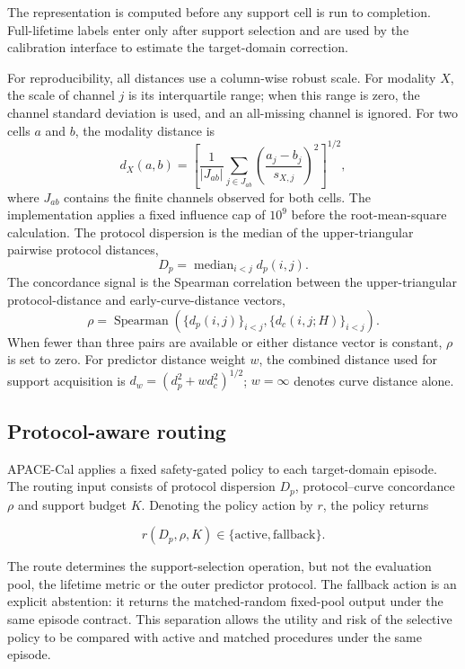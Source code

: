 \documentclass[preprint,12pt]{elsarticle}
\begin{document}
The representation is computed before any support cell is run to completion. Full-lifetime labels enter only after support selection and are used by the calibration interface to estimate the target-domain correction.

For reproducibility, all distances use a column-wise robust scale. For modality $X$, the scale of channel $j$ is its interquartile range; when this range is zero, the channel standard deviation is used, and an all-missing channel is ignored. For two cells $a$ and $b$, the modality distance is
\begin{equation}
d_X(a,b)=\left[\frac{1}{|J_{ab}|}\sum_{j\in J_{ab}}\left(\frac{a_j-b_j}{s_{X,j}}\right)^2\right]^{1/2},
\end{equation}
where $J_{ab}$ contains the finite channels observed for both cells. The implementation applies a fixed influence cap of $10^9$ before the root-mean-square calculation. The protocol dispersion is the median of the upper-triangular pairwise protocol distances,
\begin{equation}
D_p=\operatorname{median}_{i<j}d_p(i,j).
\end{equation}
The concordance signal is the Spearman correlation between the upper-triangular protocol-distance and early-curve-distance vectors,
\begin{equation}
\rho=\operatorname{Spearman}\!\left(\{d_p(i,j)\}_{i<j},\{d_c(i,j;H)\}_{i<j}\right).
\end{equation}
When fewer than three pairs are available or either distance vector is constant, $\rho$ is set to zero. For predictor distance weight $w$, the combined distance used for support acquisition is $d_w=(d_p^2+w d_c^2)^{1/2}$; $w=\infty$ denotes curve distance alone.

\subsection{Protocol-aware routing}

APACE-Cal applies a fixed safety-gated policy to each target-domain episode. The routing input consists of protocol dispersion $D_p$, protocol--curve concordance $\rho$ and support budget $K$. Denoting the policy action by $r$, the policy returns

\begin{equation}
r(D_p,\rho,K)\in\{\mathrm{active},\mathrm{fallback}\}.
\end{equation}

The route determines the support-selection operation, but not the evaluation pool, the lifetime metric or the outer predictor protocol. The fallback action is an explicit abstention: it returns the matched-random fixed-pool output under the same episode contract. This separation allows the utility and risk of the selective policy to be compared with active and matched procedures under the same episode.
\end{document}

